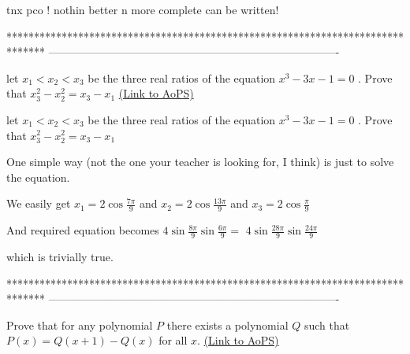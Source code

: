 \begin{solution}
	tnx pco ! nothin better n more complete can be written!
\end{solution}
*******************************************************************************
-------------------------------------------------------------------------------

\begin{problem}
	let $x_1<x_2<x_3 $ be the three real ratios of the equation $x^3-3x-1=0 $ . Prove that $x_3^2 - x_2^2=x_3-x_1$
	\flushright \href{https://artofproblemsolving.com/community/c6h587812}{(Link to AoPS)}
\end{problem}



\begin{solution}
	\begin{tcolorbox}let $x_1<x_2<x_3 $ be the three real ratios of the equation $x^3-3x-1=0 $ . Prove that $x_3^2 - x_2^2=x_3-x_1$\end{tcolorbox}
One simple way (not the one your teacher is looking for, I think) is just to solve the equation.

We easily get $x_1=2\cos \frac{7\pi}9$ and $x_2=2\cos \frac{13\pi}9$ and $x_3=2\cos\frac{\pi}9$

And required equation becomes $4\sin\frac{8\pi}9\sin\frac{6\pi}9=$ $4\sin\frac{28\pi}9\sin\frac{24\pi}9$

which is trivially true.
\end{solution}
*******************************************************************************
-------------------------------------------------------------------------------

\begin{problem}
	Prove that for any polynomial $P$ there exists a polynomial $Q$ such that $P(x)=Q(x+1)-Q(x)$ for all $x$.
	\flushright \href{https://artofproblemsolving.com/community/c6h589250}{(Link to AoPS)}
\end{problem}



